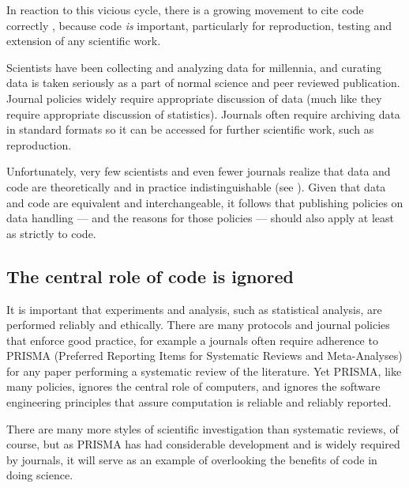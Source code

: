 \begin{change}
In reaction to this vicious cycle, there is a growing movement to cite code correctly \cite{cite-code}, because code \emph{is\/} important, particularly for reproduction, testing and extension of any scientific work. 

Scientists have been collecting and analyzing data for millennia, and curating data is taken seriously as a part of normal science and peer reviewed publication. Journal policies widely require appropriate discussion of data (much like they require appropriate discussion of statistics). Journals often require archiving data in standard formats so it can be accessed for further scientific work, such as reproduction. 

Unfortunately, very few scientists and even fewer journals realize that data and code are theoretically and in practice indistinguishable (see \supplement). Given that data and code are equivalent and interchangeable, it follows that publishing policies on data handling --- and the reasons for those policies --- should also apply at least as strictly to code.

\subsection{The central role of code is ignored}\label{central-role-of-code}
It is important that experiments and analysis, such as statistical analysis, are performed reliably and ethically. There are many protocols and journal policies that enforce good practice, for example a journals often require adherence to PRISMA (Preferred Reporting Items for Systematic Reviews and Meta-Analyses) \cite{prisma} for any paper performing a systematic review of the literature. Yet PRISMA, like many policies, ignores the central role of computers, and ignores the software engineering principles that assure computation is reliable and reliably reported. 

There are many more styles of scientific investigation than systematic reviews, of course, but as PRISMA has had considerable development and is widely required by journals, it will serve as an example of overlooking the benefits of code in doing science. 


\end{change}
